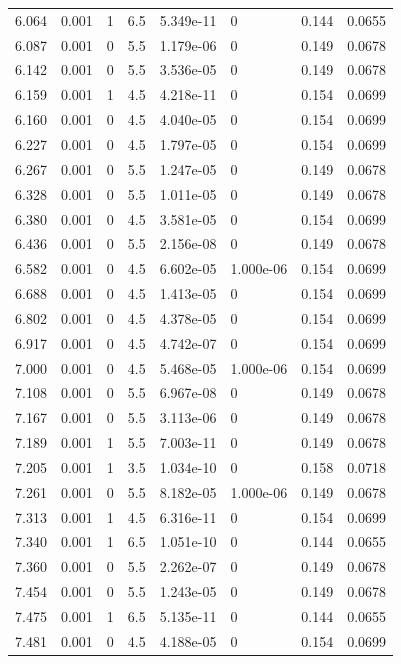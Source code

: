 \documentclass[preview]{standalone}
\begin{document}
{{{\begin{tabular}{L{1.2cm}C{1.2cm} C{0.3cm}C{0.5cm} C{1.4cm}C{1.4cm} C{1.4cm}C{1.4cm}}
  6.064  &  0.001  & 1     & 6.5 &  5.349e-11  & 0  & 0.144 &  0.0655   \\ 
  6.087  &  0.001  & 0     & 5.5 &  1.179e-06  & 0  & 0.149 &  0.0678   \\ 
  6.142  &  0.001  & 0     & 5.5 &  3.536e-05  & 0  & 0.149 &  0.0678   \\ 
  6.159  &  0.001  & 1     & 4.5 &  4.218e-11  & 0  & 0.154 &  0.0699   \\ 
  6.160  &  0.001  & 0     & 4.5 &  4.040e-05  & 0  & 0.154 &  0.0699   \\ 
  6.227  &  0.001  & 0     & 4.5 &  1.797e-05  & 0  & 0.154 &  0.0699   \\ 
  6.267  &  0.001  & 0     & 5.5 &  1.247e-05  & 0  & 0.149 &  0.0678   \\ 
  6.328  &  0.001  & 0     & 5.5 &  1.011e-05  & 0  & 0.149 &  0.0678   \\ 
  6.380  &  0.001  & 0     & 4.5 &  3.581e-05  & 0  & 0.154 &  0.0699   \\ 
  6.436  &  0.001  & 0     & 5.5 &  2.156e-08  & 0  & 0.149 &  0.0678   \\ 
  6.582  &  0.001  & 0     & 4.5 &  6.602e-05  & 1.000e-06  & 0.154 &  0.0699   \\ 
  6.688  &  0.001  & 0     & 4.5 &  1.413e-05  & 0  & 0.154 &  0.0699   \\ 
  6.802  &  0.001  & 0     & 4.5 &  4.378e-05  & 0  & 0.154 &  0.0699   \\ 
  6.917  &  0.001  & 0     & 4.5 &  4.742e-07  & 0  & 0.154 &  0.0699   \\ 
  7.000  &  0.001  & 0     & 4.5 &  5.468e-05  & 1.000e-06  & 0.154 &  0.0699   \\ 
  7.108  &  0.001  & 0     & 5.5 &  6.967e-08  & 0  & 0.149 &  0.0678   \\ 
  7.167  &  0.001  & 0     & 5.5 &  3.113e-06  & 0  & 0.149 &  0.0678   \\ 
  7.189  &  0.001  & 1     & 5.5 &  7.003e-11  & 0  & 0.149 &  0.0678   \\ 
  7.205  &  0.001  & 1     & 3.5 &  1.034e-10  & 0  & 0.158 &  0.0718   \\ 
  7.261  &  0.001  & 0     & 5.5 &  8.182e-05  & 1.000e-06  & 0.149 &  0.0678   \\ 
  7.313  &  0.001  & 1     & 4.5 &  6.316e-11  & 0  & 0.154 &  0.0699   \\ 
  7.340  &  0.001  & 1     & 6.5 &  1.051e-10  & 0  & 0.144 &  0.0655   \\ 
  7.360  &  0.001  & 0     & 5.5 &  2.262e-07  & 0  & 0.149 &  0.0678   \\ 
  7.454  &  0.001  & 0     & 5.5 &  1.243e-05  & 0  & 0.149 &  0.0678   \\ 
  7.475  &  0.001  & 1     & 6.5 &  5.135e-11  & 0  & 0.144 &  0.0655   \\ 
  7.481  &  0.001  & 0     & 4.5 &  4.188e-05  & 0  & 0.154 &  0.0699   \\ 
\hline 
\end{tabular} 

}}}
\end{document}
